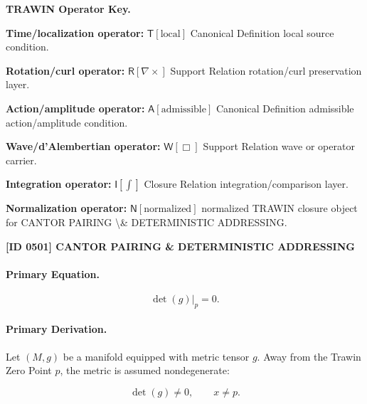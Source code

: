 \par\vspace{0.45\baselineskip}
\noindent\begin{minipage}[t]{\linewidth}
\begingroup
\small
\raggedright
\textbf{TRAWIN Operator Key.}\par
\noindent\textbf{Time/localization operator:} $\mathsf{T}\!\left[\mathrm{local}\right]$ Canonical Definition local source condition.\par
\noindent\textbf{Rotation/curl operator:} $\mathsf{R}\!\left[\nabla\times\right]$ Support Relation rotation/curl preservation layer.\par
\noindent\textbf{Action/amplitude operator:} $\mathsf{A}\!\left[\mathrm{admissible}\right]$ Canonical Definition admissible action/amplitude condition.\par
\noindent\textbf{Wave/d'Alembertian operator:} $\mathsf{W}\!\left[\Box\right]$ Support Relation wave or operator carrier.\par
\noindent\textbf{Integration operator:} $\mathsf{I}\!\left[\int\right]$ Closure Relation integration/comparison layer.\par
\noindent\textbf{Normalization operator:} $\mathsf{N}\!\left[\mathrm{normalized}\right]$ normalized TRAWIN closure object for CANTOR PAIRING \textbackslash{}\& DETERMINISTIC ADDRESSING.\par
\endgroup
\end{minipage}

\clearpage
\noindent\textbf{[ID 0501] CANTOR PAIRING \& DETERMINISTIC ADDRESSING}\par
\vspace{0.35em}
\paragraph{Primary Equation.}
\begin{equation}
\det(g)\big|_{p}=0 .
\end{equation}

\paragraph{Primary Derivation.}
Let $(M,g)$ be a manifold equipped with metric tensor $g$. Away from the Trawin Zero Point $p$, the metric is assumed nondegenerate:

\begin{equation}
\det(g)\neq 0,
\qquad x\neq p .
\end{equation}

